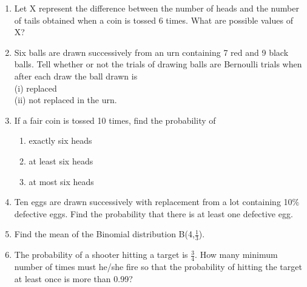 \begin{enumerate}[label=\thesection.\arabic*.,ref=\thesection.\theenumi]
\item Let X represent the difference between the number of heads and the number of tails obtained when a coin is tossed 6 times. What are possible values of X?\\
\item Six balls are drawn successively from an urn containing 7 red and 9 black balls. Tell whether or not the trials of drawing balls are Bernoulli trials when after each draw the ball drawn is\\
(i) replaced \\
(ii) not replaced in the urn.\\
\solution


\item If a fair coin is tossed 10 times, find the probability of
\begin{enumerate}
\item  exactly six heads
\item  at least six heads
\item  at most six  heads
\end{enumerate}
\solution


\item Ten eggs are drawn successively with replacement from a lot containing 10$\%$ defective eggs. Find the probability that there is at least one defective egg.\\
\solution


\item Find the mean of the Binomial distribution B(4,$\frac{1}{3}$).
\\
\solution


\item The probability of a shooter hitting a target is $\frac{3}{4}$. How many minimum
number of times must he/she fire so that the probability of hitting the target at least
once is more than 0.99?
\\
\solution



\end{enumerate}
